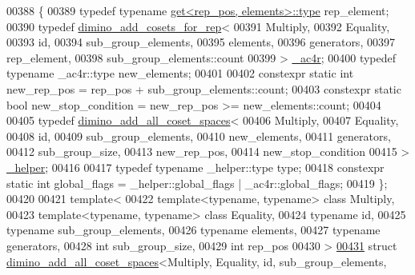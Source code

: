 \begin{DoxyCode}
00388 \{
00389   \textcolor{keyword}{typedef} \textcolor{keyword}{typename} \hyperlink{struct_eigen_1_1internal_1_1get}{get<rep\_pos, elements>::type} rep\_element;
00390   \textcolor{keyword}{typedef} \hyperlink{struct_eigen_1_1internal_1_1group__theory_1_1dimino__add__cosets__for__rep}{dimino\_add\_cosets\_for\_rep}<
00391     Multiply,
00392     Equality,
00393     id,
00394     sub\_group\_elements,
00395     elements,
00396     generators,
00397     rep\_element,
00398     sub\_group\_elements::count
00399   > \hyperlink{struct_eigen_1_1internal_1_1group__theory_1_1dimino__add__cosets__for__rep}{\_ac4r};
00400   \textcolor{keyword}{typedef} \textcolor{keyword}{typename} \_ac4r::type new\_elements;
00401   
00402   constexpr \textcolor{keyword}{static} \textcolor{keywordtype}{int} new\_rep\_pos = rep\_pos + sub\_group\_elements::count;
00403   constexpr \textcolor{keyword}{static} \textcolor{keywordtype}{bool} new\_stop\_condition = new\_rep\_pos >= new\_elements::count;
00404 
00405   \textcolor{keyword}{typedef} \hyperlink{struct_eigen_1_1internal_1_1group__theory_1_1dimino__add__all__coset__spaces}{dimino\_add\_all\_coset\_spaces}<
00406     Multiply,
00407     Equality,
00408     id,
00409     sub\_group\_elements,
00410     new\_elements,
00411     generators,
00412     sub\_group\_size,
00413     new\_rep\_pos,
00414     new\_stop\_condition
00415   > \hyperlink{struct_eigen_1_1internal_1_1group__theory_1_1dimino__add__all__coset__spaces}{\_helper};
00416 
00417   \textcolor{keyword}{typedef} \textcolor{keyword}{typename} \_helper::type type;
00418   constexpr \textcolor{keyword}{static} \textcolor{keywordtype}{int} global\_flags = \_helper::global\_flags | \_ac4r::global\_flags;
00419 \};
00420 
00421 \textcolor{keyword}{template}<
00422   \textcolor{keyword}{template}<\textcolor{keyword}{typename}, \textcolor{keyword}{typename}> \textcolor{keyword}{class }Multiply,
00423   \textcolor{keyword}{template}<\textcolor{keyword}{typename}, \textcolor{keyword}{typename}> \textcolor{keyword}{class }Equality,
00424   \textcolor{keyword}{typename} id,
00425   \textcolor{keyword}{typename} sub\_group\_elements,
00426   \textcolor{keyword}{typename} elements,
00427   \textcolor{keyword}{typename} generators,
00428   \textcolor{keywordtype}{int} sub\_group\_size,
00429   \textcolor{keywordtype}{int} rep\_pos
00430 >
\hyperlink{struct_eigen_1_1internal_1_1group__theory_1_1dimino__add__all__coset__spaces_3_01_multiply_00_014e1e7100a33430204d5dd7c50ace3f17}{00431} \textcolor{keyword}{struct }\hyperlink{struct_eigen_1_1internal_1_1group__theory_1_1dimino__add__all__coset__spaces}{dimino\_add\_all\_coset\_spaces}<Multiply, Equality, id, sub\_group\_elements, 

\end{DoxyCode}
